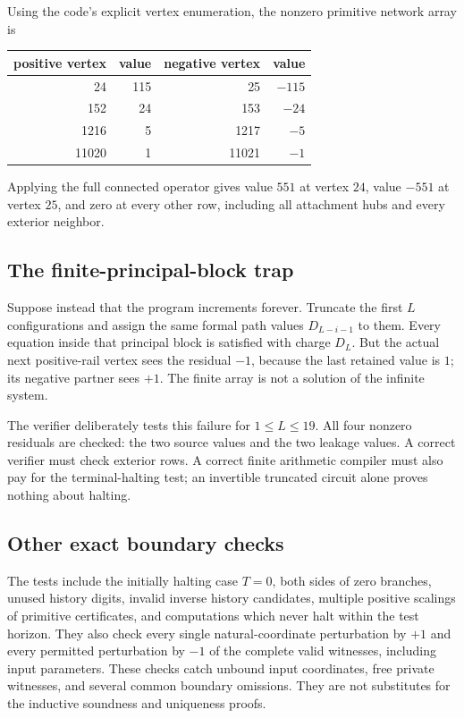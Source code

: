 \documentclass[11pt,letterpaper]{article}
\theoremstyle{definition}
\theoremstyle{remark}
\begin{document}
Using the code's explicit vertex enumeration, the nonzero primitive network
array is
\begin{center}
\begin{tabular}{@{}r r r r@{}}
\toprule
positive vertex&value&negative vertex&value\\
\midrule
24&115&25&$-115$\\
152&24&153&$-24$\\
1216&5&1217&$-5$\\
11020&1&11021&$-1$\\
\bottomrule
\end{tabular}
\end{center}
Applying the full connected operator gives value $551$ at vertex $24$,
value $-551$ at vertex $25$, and zero at every other row, including all
attachment hubs and every exterior neighbor.

\subsection{The finite-principal-block trap}
Suppose instead that the program increments forever. Truncate the first
$L$ configurations and assign the same formal path values
$D_{L-i-1}$ to them. Every equation inside that principal block is satisfied
with charge $D_L$. But the actual next positive-rail vertex sees the
residual $-1$, because the last retained value is $1$; its negative partner
sees $+1$. The finite array is not a solution of the infinite system.

The verifier deliberately tests this failure for $1\leq L\leq19$.
All four nonzero residuals are checked: the two source values and the two
leakage values. A correct verifier must check exterior rows. A correct
finite arithmetic compiler must also pay for the terminal-halting test;
an invertible truncated circuit alone proves nothing about halting.

\subsection{Other exact boundary checks}
The tests include the initially halting case $T=0$, both sides of zero
branches, unused history digits, invalid inverse history candidates,
multiple positive scalings of primitive certificates, and computations
which never halt within the test horizon. They also check every single
natural-coordinate perturbation by $+1$ and every permitted perturbation
by $-1$ of the complete valid witnesses, including input parameters.
These checks catch unbound input coordinates, free private witnesses,
and several common boundary omissions. They are not substitutes for the
inductive soundness and uniqueness proofs.
\end{document}
